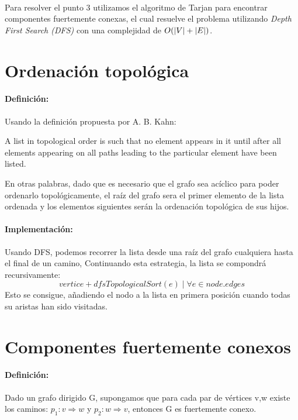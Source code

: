 \documentclass{article}
\DeclarePairedDelimiter\abs{\lvert}{\rvert}%
\begin{document}
\paragraph{}Para resolver el punto 3 utilizamos el algoritmo de Tarjan\cite{tarjan} para encontrar componentes fuertemente conexas,
el cual resuelve el problema utilizando \textit{Depth First Search (DFS)} con una complejidad de $ O(\abs{V} + \abs{E}) $.

\section{Ordenación topológica}
\paragraph{Definición:}Usando la definición propuesta por A. B. Kahn\cite{kahn}:
\begin{displayquote}
A list in topological order is such that no element appears in it until after all elements appearing on all paths leading to the particular element have been listed. 
\end{displayquote}
En otras palabras, dado que es necesario que el grafo sea acíclico para poder ordenarlo topológicamente, el raíz del grafo sera el primer elemento de la lista ordenada
y los elementos siguientes serán la ordenación topológica de sus hijos.
\paragraph{Implementación:} Usando DFS, podemos recorrer la lista desde una raíz del grafo cualquiera hasta el final de un camino,
Continuando esta estrategia, la lista se compondrá recursivamente:
\[ vertice + dfsTopologicalSort(e) \mid \forall e \in node.edges \] 
Esto se consigue, añadiendo el nodo a la lista en primera posición cuando todas su aristas han sido visitadas.
\section{Componentes fuertemente conexos}
\paragraph{Definición:} Dado un grafo dirigido G, supongamos que para cada par de vértices v,w
existe los caminos: $p_1: v \Rightarrow w$ y $p_2: w \Rightarrow v$, entonces G es fuertemente conexo.
\end{document}
